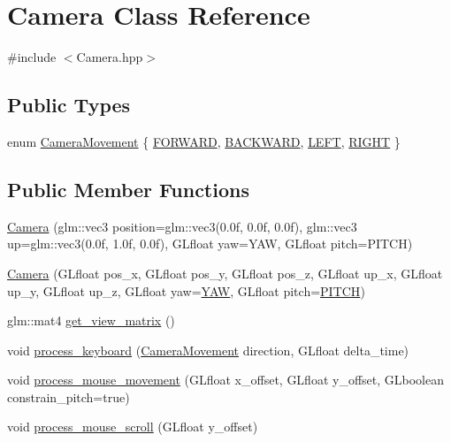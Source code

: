 \hypertarget{classCamera}{}\section{Camera Class Reference}
\label{classCamera}


{\ttfamily \#include $<$Camera.\+hpp$>$}

\subsection*{Public Types}
\begin{DoxyCompactItemize}
\item 
enum \hyperlink{classCamera_a9825f2bf1ddc209c3b2d336080d8407a}{Camera\+Movement} \{ \hyperlink{classCamera_a9825f2bf1ddc209c3b2d336080d8407aa6388b5408cf8440021383388044ae77f}{F\+O\+R\+W\+A\+RD}, 
\hyperlink{classCamera_a9825f2bf1ddc209c3b2d336080d8407aae18db08a2289896f26dcddf6e2ad274f}{B\+A\+C\+K\+W\+A\+RD}, 
\hyperlink{classCamera_a9825f2bf1ddc209c3b2d336080d8407aa1bed5588ea4c26163a72f0fc8621f6be}{L\+E\+FT}, 
\hyperlink{classCamera_a9825f2bf1ddc209c3b2d336080d8407aaedac3a8506bf2bae7df2d36dd5580884}{R\+I\+G\+HT}
 \}
\end{DoxyCompactItemize}
\subsection*{Public Member Functions}
\begin{DoxyCompactItemize}
\item 
\hyperlink{classCamera_a535f3a2413a88c2f1e7d1147bec0039c}{Camera} (glm\+::vec3 position=glm\+::vec3(0.\+0f, 0.\+0f, 0.\+0f), glm\+::vec3 up=glm\+::vec3(0.\+0f, 1.\+0f, 0.\+0f), G\+Lfloat yaw=\+Y\+A\+W, G\+Lfloat pitch=\+P\+I\+T\+C\+H)
\item 
\hyperlink{classCamera_af0f6ba09d293db5b1c6ba63d195cff57}{Camera} (G\+Lfloat pos\+\_\+x, G\+Lfloat pos\+\_\+y, G\+Lfloat pos\+\_\+z, G\+Lfloat up\+\_\+x, G\+Lfloat up\+\_\+y, G\+Lfloat up\+\_\+z, G\+Lfloat yaw=\hyperlink{classCamera_a79050e94e98c5c1cc0127c41edb4ed16}{Y\+AW}, G\+Lfloat pitch=\hyperlink{classCamera_afd43f32a47d2db8922dc32030fd84379}{P\+I\+T\+CH})
\item 
glm\+::mat4 \hyperlink{classCamera_aedac0150156798ae1880eabaa3b9f071}{get\+\_\+view\+\_\+matrix} ()
\item 
void \hyperlink{classCamera_ac32b5b8c93934f8faa8e8637dec855d4}{process\+\_\+keyboard} (\hyperlink{classCamera_a9825f2bf1ddc209c3b2d336080d8407a}{Camera\+Movement} direction, G\+Lfloat delta\+\_\+time)
\item 
void \hyperlink{classCamera_ab650c0e1f0c55582339623e7c3b4b10d}{process\+\_\+mouse\+\_\+movement} (G\+Lfloat x\+\_\+offset, G\+Lfloat y\+\_\+offset, G\+Lboolean constrain\+\_\+pitch=true)
\item 
void \hyperlink{classCamera_a9cb2efbeb1a0007f1ea908e3e74c92a1}{process\+\_\+mouse\+\_\+scroll} (G\+Lfloat y\+\_\+offset)
\end{DoxyCompactItemize}
